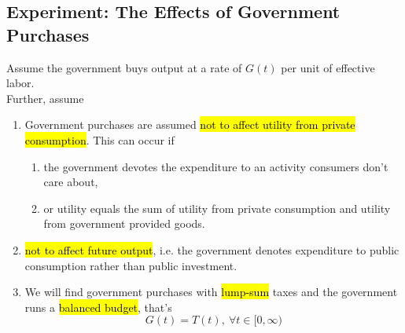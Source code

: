 \documentclass[11pt]{article}
\begin{document}
		\subsection{Experiment: The Effects of Government Purchases}
			\begin{assumption}
				Assume the government buys output at a rate of $G(t)$ per unit of effective labor.\\
				Further, assume
				\begin{enumerate}
					\item Government purchases are assumed \hl{not to affect utility from private consumption}. This can occur if
					\begin{enumerate}
						\item the government devotes the expenditure to an activity consumers don't care about, 
						\item or utility equals the sum of utility from private consumption and utility from government provided goods.
					\end{enumerate}
					\item \hl{not to affect future output}, i.e. the government denotes expenditure to public consumption rather than public investment.
					\item We will find government purchases with \hl{lump-sum} taxes and the government runs a \hl{balanced budget}, that's
					\[
						G(t) = T(t),\ \forall t \in [0, \infty)
					\]
					\end{enumerate}
			\end{assumption}
\end{document}
